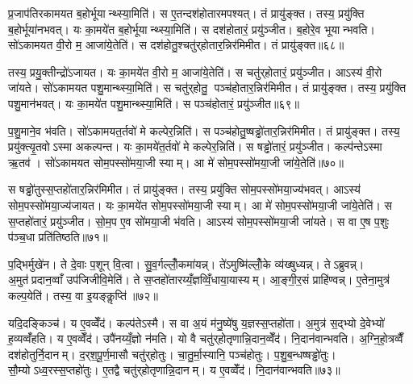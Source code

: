 प्र॒जाप॑तिरकामयत ब॒होर्भूयान्थ्स्या॒मिति॑। स ए॒तन्दश॑होतारमपश्यत्। तं प्रायु॑ङ्क्त। तस्य॒ प्रयु॑क्ति ब॒होर्भूया॑नभवत्। यः का॒मये॑त ब॒होर्भूयान्थ्स्या॒मिति॑। स दश॑होतारं॒ प्रयु॑ञ्जीत। ब॒होरे॒व भूयान्भवति। सो॑ऽकामयत वी॒रो म॒ आजा॑ये॒तेति॑। स दश॑होतु॒श्चतु॑र्‌होतार॒न्निर॑मिमीत। तं प्रायु॑ङ्क्त॥६८॥

तस्य॒ प्रयु॒क्तीन्द्रो॑ऽजायत। यः का॒मये॑त वी॒रो म॒ आजा॑ये॒तेति॑। स चतु॑र्‌होतारं॒ प्रयु॑ञ्जीत। आऽस्य॑ वी॒रो जा॑यते। सो॑ऽकामयत पशु॒मान्थ्स्या॒मिति॑। स चतु॑र्‌होतु॒ पञ्च॑होतार॒न्निर॑मिमीत। तं प्रायु॑ङ्क्त। तस्य॒ प्रयु॑क्ति पशु॒मान॑भवत्। यः का॒मये॑त पशु॒मान्थ्स्या॒मिति॑। स पञ्च॑होतारं॒ प्रयु॑ञ्जीत॥६९॥

प॒शु॒माने॒व भ॑वति। सो॑ऽकामयत॒र्तवो॑ मे कल्पेर॒न्निति॑। स पञ्च॑होतु॒ष्षड्ढो॑तार॒न्निर॑मिमीत। तं प्रायु॑ङ्क्त। तस्य॒ प्रयु॑क्त्यृ॒तवोऽस्मा अकल्पन्त। यः का॒मये॑त॒र्तवो॑ मे कल्पेर॒न्निति॑। स षड्ढो॑तारं॒ प्रयु॑ञ्जीत। कल्प॑न्तेऽस्मा ऋ॒तव॑। सो॑ऽकामयत सोम॒पस्सो॑मया॒जी स्याम्। आ मे॑ सोम॒पस्सो॑मया॒जी जा॑ये॒तेति॑॥७०॥

स षड्ढो॑तुस्स॒प्तहो॑तार॒न्निर॑मिमीत। तं प्रायु॑ङ्क्त। तस्य॒ प्रयु॑क्ति सोम॒पस्सो॑मया॒ज्य॑भवत्। आऽस्य॑ सोम॒पस्सो॑मया॒ज्य॑जायत। यः का॒मये॑त सोम॒पस्सो॑मया॒जी स्याम्। आ मे॑ सोम॒पस्सो॑मया॒जी जा॑ये॒तेति॑। स स॒प्तहो॑तारं॒ प्रयु॑ञ्जीत। सो॒म॒प ए॒व सो॑मया॒जी भ॑वति। आऽस्य॑ सोम॒पस्सो॑मया॒जी जा॑यते। स वा ए॒ष प॒शुः प॑ञ्च॒धा प्रति॑तिष्ठति॥७१॥

प॒द्भिर्मुखे॑न। ते दे॒वाः प॒शून् वि॒त्वा। सु॒व॒र्गल्लोँ॒कमा॑यन्न्। ते॑ऽमुष्मि॑ल्लोँ॒के व्य॑ख्षुध्यन्न्। तेऽब्रुवन्न्। अ॒मुत॑प्रदान॒व्वाँ उप॑जिजीवि॒मेति॑। ते स॒प्तहो॑तारय्यँ॒ज्ञव्विँ॒धाया॒यास्यम्। आ॒ङ्गी॒र॒सं प्राहि॑ण्वन्न्। ए॒तेना॒मुत्र॑ कल्प॒येति॑। तस्य॒ वा इ॒यङ्कॢप्ति॑॥७२॥

यदि॒दङ्किञ्च॑। य ए॒वव्वेँद॑। कल्प॑तेऽस्मै। स वा अ॒यं म॑नु॒ष्ये॑षु य॒ज्ञस्स॒प्तहो॑ता। अ॒मुत्र॑ स॒द्भ्यो दे॒वेभ्यो॑ ह॒व्यव्वँ॑हति। य ए॒वव्वेँद॑। उपै॑नय्यँ॒ज्ञो न॑मति। यो वै चतु॑र्‌होतृणान्नि॒दान॒व्वेँद॑। नि॒दान॑वान्भवति। अ॒ग्नि॒हो॒त्रव्वैँ दश॑होतुर्नि॒दानम्। द॒र्‌श॒पू॒र्ण॒मासौ चतु॑र्‌होतुः। चा॒तु॒र्मा॒स्यानि॒ पञ्च॑होतुः। प॒शु॒ब॒न्धष्षड्ढो॑तुः। सौ॒म्योऽध्व॒रस्स॒प्तहो॑तुः। ए॒तद्वै चतु॑र्‌होतृणान्नि॒दानम्। य ए॒वव्वेँद॑। नि॒दान॑वान्भवति॥७३॥


